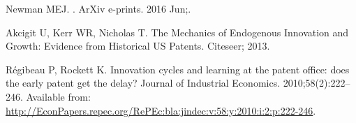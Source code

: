 \documentclass[10pt,A4,draft]{article}
\begin{document}
\begin{thebibliography}{10}
{Newman} MEJ.
.
\newblock ArXiv e-prints. 2016 Jun;.

Akcigit U, Kerr WR, Nicholas T.
\newblock The Mechanics of Endogenous Innovation and Growth: Evidence from
  Historical US Patents.
\newblock Citeseer; 2013.

R{\'e}gibeau P, Rockett K.
\newblock Innovation cycles and learning at the patent office: does the early
  patent get the delay?
\newblock Journal of Industrial Economics. 2010;58(2):222--246.
\newblock Available from:
  \url{http://EconPapers.repec.org/RePEc:bla:jindec:v:58:y:2010:i:2:p:222-246}.

\end{thebibliography}























%
%
%
%
%
%
%
%
%
\end{document}
